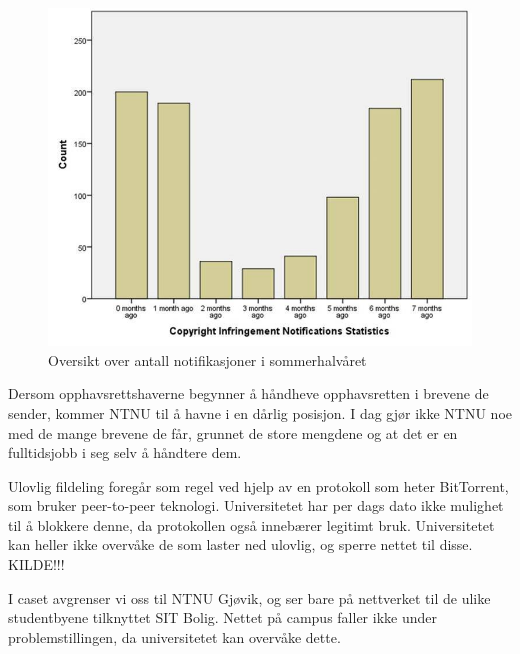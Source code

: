 \begin{figure}[H]
    \centering
    \includegraphics[scale=0.8]{case_1/bilder/copyright.jpg}
    \caption[Copyright Infringement Notifications]{Oversikt over antall notifikasjoner i sommerhalvåret}
    \label{fig:copyright}
\end{figure}

Dersom opphavsrettshaverne begynner å håndheve opphavsretten i brevene de sender, kommer NTNU til å havne i en dårlig posisjon. I dag gjør ikke NTNU noe med de mange brevene de får, grunnet de store mengdene og at det er en fulltidsjobb i seg selv å håndtere dem.

Ulovlig fildeling foregår som regel ved hjelp av en protokoll som heter BitTorrent, som bruker peer-to-peer teknologi. Universitetet har per dags dato ikke mulighet til å blokkere denne, da protokollen også innebærer legitimt bruk. Universitetet kan heller ikke overvåke de som laster ned ulovlig, og sperre nettet til disse. KILDE!!!

I caset avgrenser vi oss til NTNU Gjøvik, og ser bare på nettverket til de ulike studentbyene tilknyttet SIT Bolig. Nettet på campus faller ikke under problemstillingen, da universitetet kan overvåke dette.